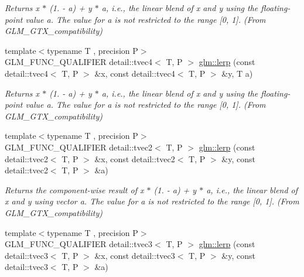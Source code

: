\begin{DoxyCompactItemize}
\begin{DoxyCompactList}\small\item\em Returns x $\ast$ (1. -\/ a) + y $\ast$ a, i.\+e., the linear blend of x and y using the floating-\/point value a. The value for a is not restricted to the range \mbox{[}0, 1\mbox{]}. (From G\+L\+M\+\_\+\+G\+T\+X\+\_\+compatibility) \end{DoxyCompactList}\item 
{\footnotesize template$<$typename T , precision P$>$ }\\G\+L\+M\+\_\+\+F\+U\+N\+C\+\_\+\+Q\+U\+A\+L\+I\+F\+I\+ER detail\+::tvec4$<$ T, P $>$ \hyperlink{group__gtx__compatibility_ga063de7edddb13ecc44fcfddd9bf38111}{glm\+::lerp} (const detail\+::tvec4$<$ T, P $>$ \&x, const detail\+::tvec4$<$ T, P $>$ \&y, T a)\hypertarget{group__gtx__compatibility_ga063de7edddb13ecc44fcfddd9bf38111}{}\label{group__gtx__compatibility_ga063de7edddb13ecc44fcfddd9bf38111}

\begin{DoxyCompactList}\small\item\em Returns x $\ast$ (1. -\/ a) + y $\ast$ a, i.\+e., the linear blend of x and y using the floating-\/point value a. The value for a is not restricted to the range \mbox{[}0, 1\mbox{]}. (From G\+L\+M\+\_\+\+G\+T\+X\+\_\+compatibility) \end{DoxyCompactList}\item 
{\footnotesize template$<$typename T , precision P$>$ }\\G\+L\+M\+\_\+\+F\+U\+N\+C\+\_\+\+Q\+U\+A\+L\+I\+F\+I\+ER detail\+::tvec2$<$ T, P $>$ \hyperlink{group__gtx__compatibility_ga9cc12766a2675ce054a30b0cab4b567b}{glm\+::lerp} (const detail\+::tvec2$<$ T, P $>$ \&x, const detail\+::tvec2$<$ T, P $>$ \&y, const detail\+::tvec2$<$ T, P $>$ \&a)\hypertarget{group__gtx__compatibility_ga9cc12766a2675ce054a30b0cab4b567b}{}\label{group__gtx__compatibility_ga9cc12766a2675ce054a30b0cab4b567b}

\begin{DoxyCompactList}\small\item\em Returns the component-\/wise result of x $\ast$ (1. -\/ a) + y $\ast$ a, i.\+e., the linear blend of x and y using vector a. The value for a is not restricted to the range \mbox{[}0, 1\mbox{]}. (From G\+L\+M\+\_\+\+G\+T\+X\+\_\+compatibility) \end{DoxyCompactList}\item 
{\footnotesize template$<$typename T , precision P$>$ }\\G\+L\+M\+\_\+\+F\+U\+N\+C\+\_\+\+Q\+U\+A\+L\+I\+F\+I\+ER detail\+::tvec3$<$ T, P $>$ \hyperlink{group__gtx__compatibility_gaa07546447a0138988802c82cf38aa53d}{glm\+::lerp} (const detail\+::tvec3$<$ T, P $>$ \&x, const detail\+::tvec3$<$ T, P $>$ \&y, const detail\+::tvec3$<$ T, P $>$ \&a)\hypertarget{group__gtx__compatibility_gaa07546447a0138988802c82cf38aa53d}{}\label{group__gtx__compatibility_gaa07546447a0138988802c82cf38aa53d}


\end{DoxyCompactItemize}
